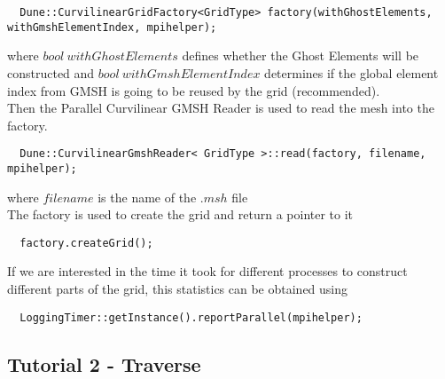 \begin{mybox}
\begin{lstlisting}
  Dune::CurvilinearGridFactory<GridType> factory(withGhostElements, withGmshElementIndex, mpihelper);
\end{lstlisting}
\end{mybox}

\noindent
where $bool\ withGhostElements$ defines whether the Ghost Elements will be constructed and $bool\ withGmshElementIndex$ determines if the global element index from GMSH is going to be reused by the grid (recommended). \\

\noindent
Then the Parallel Curvilinear GMSH Reader is used to read the mesh into the factory. \\

\begin{mybox}
\begin{lstlisting}
  Dune::CurvilinearGmshReader< GridType >::read(factory, filename, mpihelper); 
\end{lstlisting}
\end{mybox}

\noindent
where $filename$ is the name of the $.msh$ file \\

\noindent
The factory is used to create the grid and return a pointer to it \\
\begin{mybox}
\begin{lstlisting}
  factory.createGrid();
\end{lstlisting}
\end{mybox}

If we are interested in the time it took for different processes to construct different parts of the grid, this statistics can be obtained using \\

\begin{mybox}
\begin{lstlisting}
  LoggingTimer::getInstance().reportParallel(mpihelper);
\end{lstlisting}
\end{mybox}



\subsection{Tutorial 2 - Traverse}
\label{usage-howto-tutorial-traverse}

